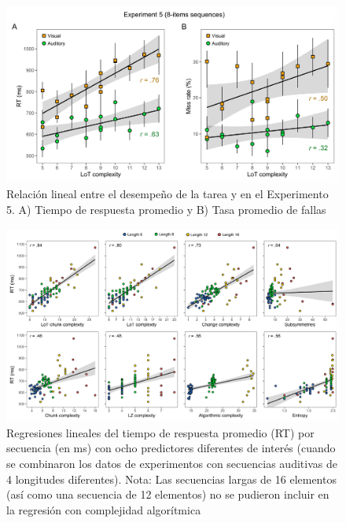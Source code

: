 \begin{figure}[t!]
      \includegraphics[scale=0.8]{figuras/plosbio/journal.pcbi.1008598.s008.png}
      \centering
      \caption{Relación lineal entre el desempeño de la tarea y \mdlbin en el Experimento 5. A) Tiempo de respuesta promedio y B) Tasa promedio de fallas}
      \label{PlosBIO-S8}
\end{figure}

\begin{figure}[t!]
      \includegraphics[scale=0.8]{figuras/plosbio/journal.pcbi.1008598.s009.png}
      \centering
      \caption{ Regresiones lineales del tiempo de respuesta promedio (RT) por secuencia (en ms) con ocho predictores diferentes de interés (cuando se combinaron los datos de experimentos con secuencias auditivas de 4 longitudes diferentes). Nota: Las secuencias largas de 16 elementos (así como una secuencia de 12 elementos) no se pudieron incluir en la regresión con complejidad algorítmica}
      \label{PlosBIO-S9}
\end{figure}

